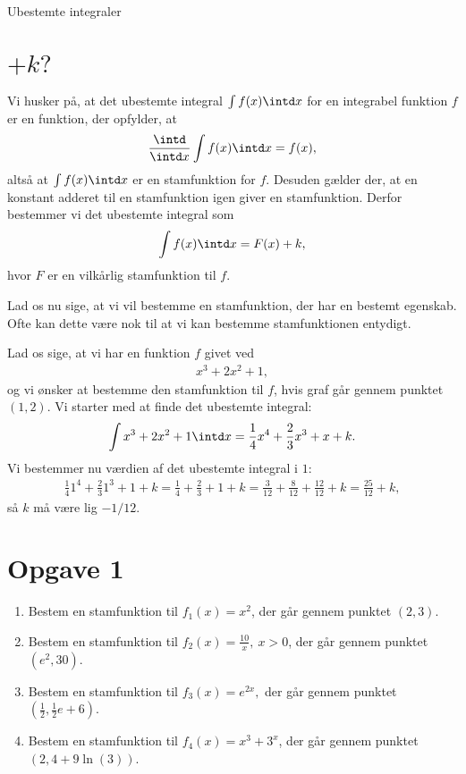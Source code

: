 
\begin{center}
\Huge
Ubestemte integraler
\end{center}

\section*{$+k?$}

Vi husker på, at det ubestemte integral $\int f(x)\intd x$ for en integrabel funktion $f$ er en funktion, der opfylder, at 
\begin{align*}
\frac{\intd}{\intd x} \int f(x) \intd x = f(x),
\end{align*}
altså at $\int f(x) \intd x$ er en stamfunktion for $f$. Desuden gælder der, at en konstant adderet til en stamfunktion igen giver en stamfunktion. Derfor bestemmer vi det ubestemte integral som
\begin{align*}
\int f(x) \intd x = F(x) + k,
\end{align*}
hvor $F$ er en vilkårlig stamfunktion til $f$. 

Lad os nu sige, at vi vil bestemme en stamfunktion, der har en bestemt egenskab. Ofte kan dette være nok til at vi kan bestemme stamfunktionen entydigt.
\begin{exa}
Lad os sige, at vi har en funktion $f$ givet ved 
\begin{align*}
x^3+2x^2+1,
\end{align*}
og vi ønsker at bestemme den stamfunktion til $f$, hvis graf går gennem punktet $(1,2)$. Vi starter med at finde det ubestemte integral:
\begin{align*}
\int x^3+2x^2+1 \intd x = \frac{1}{4}x^4+\frac{2}{3}x^3+x + k.
\end{align*}
Vi bestemmer nu værdien af det ubestemte integral i $1$:
\begin{align*}
\frac{1}{4}1^4+\frac{2}{3}1^3+1+k = \frac{1}{4}+\frac{2}{3}+1+k = \frac{3}{12} + \frac{8}{12}+\frac{12}{12}+k = \frac{25}{12}+k,
\end{align*}
så $k$ må være lig $-1/12.$
\end{exa}
\section*{Opgave 1}
\begin{enumerate}[label=\roman*)]
\item Bestem en stamfunktion til $f_1(x)=x^2$, der går gennem punktet $(2,3)$. 
\item Bestem en stamfunktion til $f_2(x) = \frac{10}{x}, \ x>0$, der går gennem punktet $(e^2,30)$.
\item Bestem en stamfunktion til $f_3(x) = e^{2x},$ der går gennem punktet $(\frac{1}{2},\frac{1}{2}e+6)$.
\item Bestem en stamfunktion til $f_4(x) = x^3 + 3^x$, der går gennem punktet $(2,4+9\ln(3))$.
\end{enumerate}
